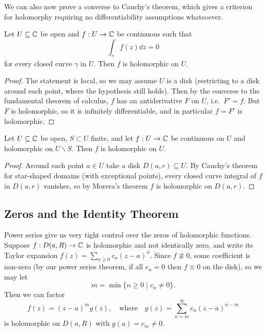 \documentclass[a4paper]{scrartcl}
\begin{document}
We can also now prove a converse to Cauchy's theorem, which gives a criterion for holomorphy requiring no differentiability assumptions whatsoever.

\begin{theorem}
    Let $U \subseteq \mathbb{C}$ be open and $f: U \rightarrow \mathbb{C}$ be continuous such that
    $$
    \int_\gamma f(z) \dd z = 0
    $$
    for every closed curve $\gamma$ in $U$. Then $f$ is holomorphic on $U$.
\end{theorem}
\begin{proof}
    The statement is local, so we may assume $U$ is a disk (restricting to a disk around each point, where the hypothesis still holds). Then by the converse to the fundamental theorem of calculus, $f$ has an antiderivative $F$ on $U$, i.e.\ $F' = f$. But $F$ is holomorphic, so it is infinitely differentiable, and in particular $f = F'$ is holomorphic.
\end{proof}

\begin{corollary}
    Let $U \subseteq \mathbb{C}$ be open, $S \subset U$ finite, and let $f: U \rightarrow \mathbb{C}$ be continuous on $U$ and holomorphic on $U \backslash S$. Then $f$ is holomorphic on $U$.
\end{corollary}
\begin{proof}
    Around each point $a \in U$ take a disk $D(a, r) \subseteq U$. By Cauchy's theorem for star-shaped domains (with exceptional points), every closed curve integral of $f$ in $D(a, r)$ vanishes, so by Morera's theorem $f$ is holomorphic on $D(a, r)$.
\end{proof}

\subsection{Zeros and the Identity Theorem}

Power series give us very tight control over the zeros of holomorphic functions. Suppose $f: D(a, R) \rightarrow \mathbb{C}$ is holomorphic and not identically zero, and write its Taylor expansion $f(z) = \sum_{n \geq 0} c_n (z - a)^n$. Since $f \not\equiv 0$, some coefficient is non-zero (by our power series theorem, if all $c_n = 0$ then $f \equiv 0$ on the disk), so we may let
$$
m = \min\{n \geq 0 \mid c_n \neq 0\}.
$$
Then we can factor
$$
f(z) = (z - a)^m g(z), \quad \text{where} \quad g(z) = \sum_{n = m}^{\infty} c_n (z - a)^{n - m}
$$
is holomorphic on $D(a, R)$ with $g(a) = c_m \neq 0$.
\end{document}
